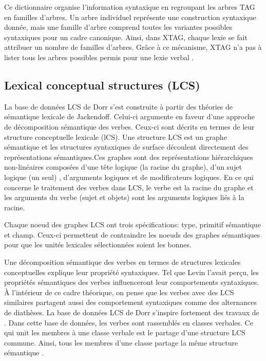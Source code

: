 Ce dictionnaire organise l'information syntaxique en regroupant les arbres \ac{TAG} en familles d'arbres. Un arbre individuel représente une construction syntaxique donnée, mais une famille d'arbre comprend toutes les variantes possibles syntaxiques pour un cadre canonique. Ainsi, dans XTAG, chaque lexie se fait attribuer un nombre de familles d'arbres. Grâce à ce mécanisme, XTAG n'a pas à lister tous les arbres possibles permis pour une lexie verbal \citep{DoranXTAGSystemWide1994}.

\subsection{Lexical conceptual structures (LCS)}
La base de données LCS de Dorr s'est construite à partir des théories de sémantique lexicale de Jackendoff. Celui-ci argumente en faveur d'une approche de décomposition sémantique des verbes. Ceux-ci sont décrits en termes de leur structure conceptuelle lexicale (lCS)\citep{DorrUseLexicalSemantics1992}. Une structure LCS est un graphe sémantique et les structures syntaxiques de surface découlent directement des représentations sémantiques.Ces graphes sont des représentations hiérarchiques non-linéaires composées d'une tête logique (la racine du graphe), d'un sujet logique (un seul) , d'arguments logiques et de modificateurs logiques. En ce qui concerne le traitement des verbes dans LCS, le verbe est la racine du graphe et les arguments du verbe (sujet et objets) sont les arguments logiques liés à la racine.

Chaque noe{}ud des graphes LCS ont trois spécifications: type, primitif sémantique et champ. Ceux-ci permettent de contraindre les noe{}uds des graphes sémantiques pour que les unités lexicales sélectionnées soient les bonnes.

Une décomposition sémantique des verbes en termes de structures lexicales conceptuelles explique leur propriété syntaxiques. Tel que Levin l'avait perçu, les propriétés sémantiques des verbes influenceront leur comportements syntaxiques. À l'intérieur de ce cadre théorique, on pense que les verbes avec des LCS similaires partagent aussi des comportement syntaxiques comme des alternances de diathèses. La base de données LCS de Dorr s'inspire fortement des travaux de \cite{verb-classes.levin.1993}. Dans cette base de données, les verbes sont rassemblés en classes verbales. Ce qui unit les membres à une classe verbale est le partage d'une structure LCS commune. Ainsi, tous les membres d'une classe partage la même structure sémantique \citep{TraumGenerationLexicalConceptual2000}.


